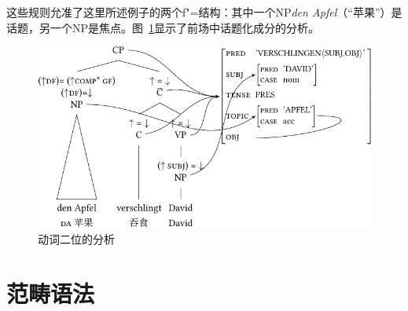 \begin{enumerate}
\noindent
这些规则允准了这里所述例子的两个f"=结构：其中一个NP\emph{den
  Apfel}（“苹果”）是话题，另一个NP是焦点。图~\ref{Abbildung-V2-LFG}显示了前场中话题化成分的分析。

\begin{figure}
\centerline{%
\includegraphics{Figures/den-apfel-verschlingt-david-lfg-lsp-crop}
}
\caption{\label{Abbildung-V2-LFG}动词二位的分析}
\end{figure}%
\end{enumerate}

\pagebreak
\section{范畴语法}

